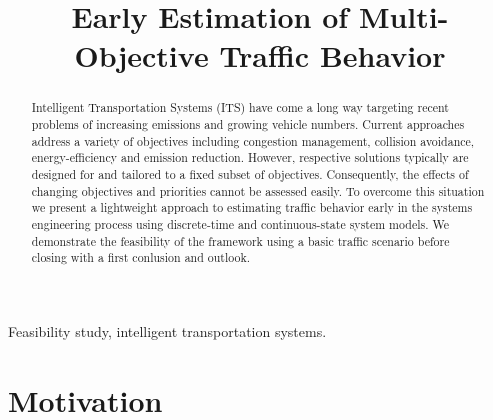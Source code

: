 \documentclass[conference]{../cls/IEEEtran}
\begin{document}
\title{Early Estimation of Multi-Objective Traffic Behavior}

\author{
	\and
}

\maketitle

\begin{abstract}
Intelligent Transportation Systems (ITS) have come a long way targeting recent problems of increasing emissions and growing vehicle numbers. Current approaches address a variety of objectives including congestion management, collision avoidance, energy-efficiency and emission reduction. However, respective solutions typically are designed for and tailored to a fixed subset of objectives. Consequently, the effects of changing objectives and priorities cannot be assessed easily. To overcome this situation we present a lightweight approach to estimating traffic behavior early in the systems engineering process using discrete-time and continuous-state system models. We demonstrate the feasibility of the framework using a basic traffic scenario before closing with a first conlusion and outlook.
\end{abstract}

\begin{IEEEkeywords}
Feasibility study, intelligent transportation systems.
\end{IEEEkeywords}

\section{Motivation}
\label{sec:motivation}
\end{document}
